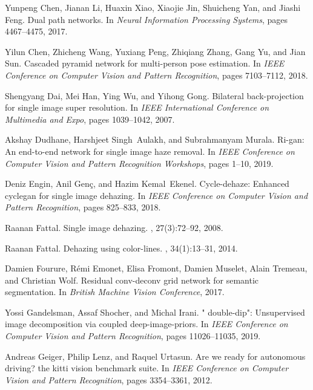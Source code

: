 \documentclass[10pt,twocolumn,letterpaper]{article}
\begin{document}
\begin{thebibliography}{10}
Yunpeng Chen, Jianan Li, Huaxin Xiao, Xiaojie Jin, Shuicheng Yan, and Jiashi
  Feng.
\newblock Dual path networks.
\newblock In {\em Neural Information Processing Systems}, pages 4467--4475,
  2017.

Yilun Chen, Zhicheng Wang, Yuxiang Peng, Zhiqiang Zhang, Gang Yu, and Jian Sun.
\newblock Cascaded pyramid network for multi-person pose estimation.
\newblock In {\em IEEE Conference on Computer Vision and Pattern Recognition},
  pages 7103--7112, 2018.

Shengyang Dai, Mei Han, Ying Wu, and Yihong Gong.
\newblock Bilateral back-projection for single image super resolution.
\newblock In {\em IEEE International Conference on Multimedia and Expo}, pages
  1039--1042, 2007.

Akshay Dudhane, Harshjeet Singh~Aulakh, and Subrahmanyam Murala.
\newblock Ri-gan: An end-to-end network for single image haze removal.
\newblock In {\em IEEE Conference on Computer Vision and Pattern Recognition
  Workshops}, pages 1--10, 2019.

Deniz Engin, Anil Gen{\c{c}}, and Hazim Kemal~Ekenel.
\newblock Cycle-dehaze: Enhanced cyclegan for single image dehazing.
\newblock In {\em IEEE Conference on Computer Vision and Pattern Recognition},
  pages 825--833, 2018.

Raanan Fattal.
\newblock Single image dehazing.
, 27(3):72--92, 2008.

Raanan Fattal.
\newblock Dehazing using color-lines.
, 34(1):13--31, 2014.

Damien Fourure, R{\'e}mi Emonet, Elisa Fromont, Damien Muselet, Alain Tremeau,
  and Christian Wolf.
\newblock Residual conv-deconv grid network for semantic segmentation.
\newblock In {\em British Machine Vision Conference}, 2017.

Yossi Gandelsman, Assaf Shocher, and Michal Irani.
\newblock " double-dip": Unsupervised image decomposition via coupled
  deep-image-priors.
\newblock In {\em IEEE Conference on Computer Vision and Pattern Recognition},
  pages 11026--11035, 2019.

Andreas Geiger, Philip Lenz, and Raquel Urtasun.
\newblock Are we ready for autonomous driving? the kitti vision benchmark
  suite.
\newblock In {\em IEEE Conference on Computer Vision and Pattern Recognition},
  pages 3354--3361, 2012.


\end{thebibliography}
\end{document}
